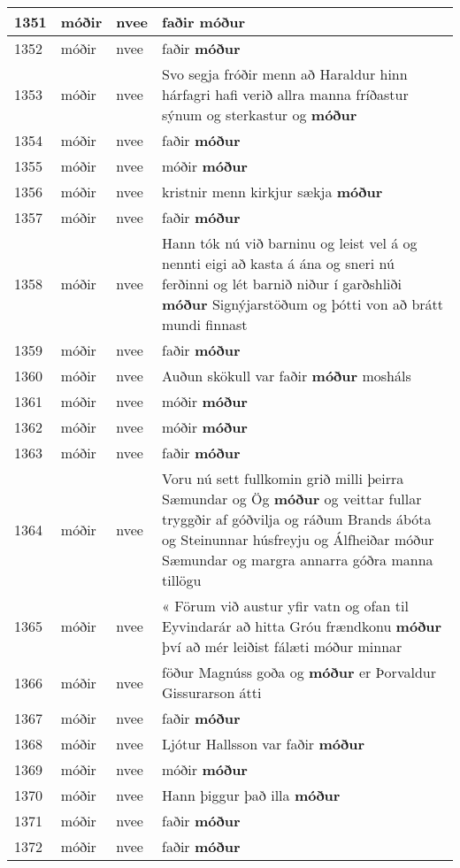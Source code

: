 \documentclass{article}
\begin{document}
\begin{longtable}{p{1cm}|p{1cm}|p{1cm}|p{13cm}}
\hline
1351&móðir&nvee&faðir \textbf{móður} \\
\hline
1352&móðir&nvee&faðir \textbf{móður} \\
\hline
1353&móðir&nvee&Svo segja fróðir menn að Haraldur hinn hárfagri hafi verið allra manna fríðastur sýnum og sterkastur og \textbf{móður} \\
\hline
1354&móðir&nvee&faðir \textbf{móður} \\
\hline
1355&móðir&nvee&móðir \textbf{móður} \\
\hline
1356&móðir&nvee&kristnir menn kirkjur sækja \textbf{móður} \\
\hline
1357&móðir&nvee&faðir \textbf{móður} \\
\hline
1358&móðir&nvee&Hann tók nú við barninu og leist vel á og nennti eigi að kasta á ána og sneri nú ferðinni og lét barnið niður í garðshliði \textbf{móður} Signýjarstöðum og þótti von að brátt mundi finnast\\
\hline
1359&móðir&nvee&faðir \textbf{móður} \\
\hline
1360&móðir&nvee&Auðun skökull var faðir \textbf{móður} mosháls\\
\hline
1361&móðir&nvee&móðir \textbf{móður} \\
\hline
1362&móðir&nvee&móðir \textbf{móður} \\
\hline
1363&móðir&nvee&faðir \textbf{móður} \\
\hline
1364&móðir&nvee&Voru nú sett fullkomin grið milli þeirra Sæmundar og Ög \textbf{móður} og veittar fullar tryggðir af góðvilja og ráðum Brands ábóta og Steinunnar húsfreyju og Álfheiðar móður Sæmundar og margra annarra góðra manna tillögu\\
\hline
1365&móðir&nvee&« Förum við austur yfir vatn og ofan til Eyvindarár að hitta Gróu frændkonu \textbf{móður} því að mér leiðist fálæti móður minnar\\
\hline
1366&móðir&nvee&föður Magnúss goða og \textbf{móður} er Þorvaldur Gissurarson átti\\
\hline
1367&móðir&nvee&faðir \textbf{móður} \\
\hline
1368&móðir&nvee&Ljótur Hallsson var faðir \textbf{móður} \\
\hline
1369&móðir&nvee&móðir \textbf{móður} \\
\hline
1370&móðir&nvee&Hann þiggur það illa \textbf{móður} \\
\hline
1371&móðir&nvee&faðir \textbf{móður} \\
\hline
1372&móðir&nvee&faðir \textbf{móður} \\

\end{longtable}
\end{document}
